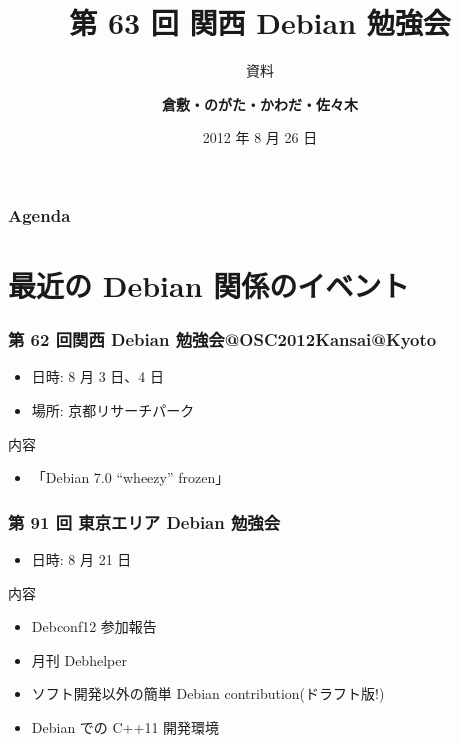 \documentclass[cjk,dvipdfmx,10pt,%
hyperref={bookmarks=true,bookmarksnumbered=true,bookmarksopen=false,%
colorlinks=false,%
pdftitle={第 63 回 関西 Debian 勉強会},%
pdfauthor={倉敷・のがた・かわだ・佐々木},%
pdfsubject={資料},%
}]{beamer}
\title{第 63 回 関西 Debian 勉強会}
\subtitle{{\scriptsize 資料}}
\author[かわだ てつたろう]{{\large\bf 倉敷・のがた・かわだ・佐々木}}
\institute[Debian JP]{{\normalsize\tt 関西 Debian 勉強会}}
\date{{\small 2012 年 8 月 26 日}}
\begin{document}
\settitleslide
\begin{frame}
\titlepage
\end{frame}
\setdefaultslide

\begin{frame}[fragile]
\frametitle{Agenda}

\tableofcontents

\end{frame}

\section{最近の Debian 関係のイベント}


\begin{frame}[fragile]
\frametitle{第 62 回関西 Debian 勉強会@OSC2012Kansai@Kyoto}

\begin{itemize}
\item 日時: 8 月 3 日、4 日
\item 場所: 京都リサーチパーク
\end{itemize}
\begin{block}{内容}
  \begin{itemize}
  \item 「Debian 7.0 ``wheezy'' frozen」
  \end{itemize}
\end{block}
\end{frame}

\begin{frame}[fragile]
  \frametitle{第 91 回 東京エリア Debian 勉強会}
  \begin{itemize}
  \item  日時: 8 月 21 日
  \end{itemize}
  \begin{block}{内容}
    \begin{itemize}
    \item Debconf12 参加報告
    \item 月刊 Debhelper
    \item ソフト開発以外の簡単 Debian contribution(ドラフト版!)
    \item Debian での C++11 開発環境
    \end{itemize}
  \end{block}
\end{frame}

\end{document}
